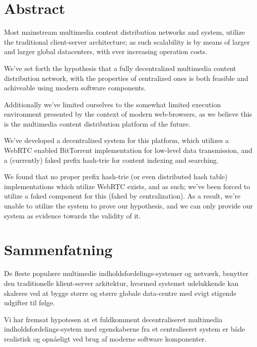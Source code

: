 \begingroup
\let\clearpage\relax
\let\cleardoublepage\relax
\let\cleardoublepage\relax

\chapter*{Abstract}
Most mainstream multimedia content distribution networks and system, utilize
the traditional client-server architecture; as such scalability is by means of
larger and larger global datacenters, with ever increasing operation costs.

We've set forth the hypothesis that a fully decentralized multimedia content 
distribution network, with the properties of centralized ones is both feasible
and achiveable using modern software components.

Additionally we've limited ourselves to the somewhat limited execution
environment presented by the context of modern web-browsers, as we believe this
is the multimedia content distribution platform of the future.

We've developed a decentralized system for this platform, which utilizes a WebRTC
enabled BitTorrent implementation for low-level data transmission, and a 
(currently) faked prefix hash-trie for content indexing and searching.

We found that no proper prefix hash-trie (or even distributed hash table)
implementations which utilize WebRTC exists, and as such; we've been forced to
utilize a faked component for this (faked by centralization). As a result,
we're unable to utilize the system to prove our hypothesis, and we can only
provide our system as evidence towards the validity of it.

\vfill

\chapter*{Sammenfatning}
De fleste populære multimedie indholdsfordelings-systemer og netværk,
benytter den traditionelle klient-server arkitektur, hvormed systemet
udelukkende kan skaleres ved at bygge større og større globale data-centre
med evigt stigende udgifter til følge.

Vi har fremsat hypotesen at et fuldkomment decentraliseret multimedia 
indholdsfordelings-system med egenskaberne fra et centraliseret system er både
realistisk og opnåeligt ved brug af moderne software komponenter.

